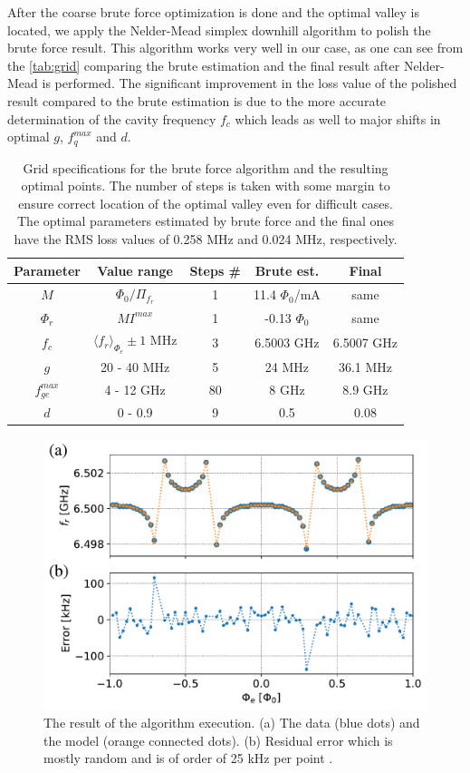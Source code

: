 \documentclass[%
 aip,
 amsmath,amssymb,
 reprint,%
]{revtex4-1}
\begin{document}
After the coarse brute force optimization is done and the optimal valley is located, we apply the Nelder-Mead simplex downhill algorithm to polish the brute force result. This algorithm works very well in our case, as one can see from the \autoref{tab:grid} comparing the brute estimation and  the final result after Nelder-Mead is performed. The significant improvement in the loss value of the polished result compared to the brute estimation is due to the more accurate determination of the cavity frequency $f_c$ which leads as well to major shifts in optimal $g$, $f_{q}^{max}$ and $d$.

\begin{table}
\centering
\begin{ruledtabular}
\begin{tabular}{ccccc} 
Parameter & Value range & Steps \# & Brute est. & Final \\ 
\hline
$M$ & $\Phi_0/\Pi_{f_r}$ & 1 & 11.4 $\Phi_0$/mA &  same \\
$\Phi_r$ & $M I^{max}$ & 1 & -0.13 $\Phi_0$ & same \\
$f_c$ & $\langle f_r \rangle_{\Phi_e} \pm 1$ MHz & 3 & 6.5003 GHz & 6.5007 GHz\\
$g$ & 20 - 40 MHz & 5 & 24 MHz & 36.1 MHz \\
$f_{ge}^{max}$ &  4 - 12 GHz & 80 & 8 GHz & 8.9 GHz\\
$d$& 0 - 0.9 & 9 & 0.5 & 0.08\\ 
\end{tabular} 
\end{ruledtabular}
\caption{Grid specifications for the brute force algorithm and the resulting optimal points. The number of steps is taken with some margin to ensure correct location of the optimal valley even for difficult cases. The optimal parameters estimated by brute force and the final ones have the RMS loss values of 0.258 MHz and 0.024 MHz, respectively.}
\label{tab:grid}
\end{table}


\begin{figure}
\centering
\includegraphics[width=\linewidth]{fit}
\caption{The result of the algorithm execution. (a) The data (blue dots) and the model (orange connected dots). (b) Residual error which is mostly random and is of order of 25 kHz per point .}
\label{fig:anti_fit}
\end{figure}
\end{document}
